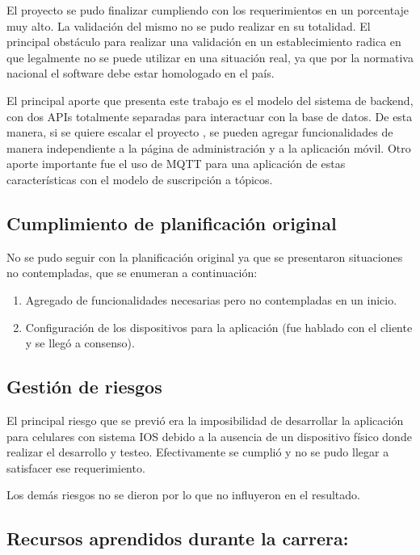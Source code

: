 El proyecto se pudo finalizar cumpliendo con los requerimientos en un porcentaje muy alto. La validación del mismo no se pudo realizar en su totalidad. El principal obstáculo para realizar una validación en un establecimiento radica en que legalmente no se puede utilizar en una situación real, ya que por la normativa nacional el software debe estar homologado en el país.  


El principal aporte que presenta este trabajo es el modelo del sistema de backend, con dos APIs totalmente separadas para interactuar con la base de datos. De esta manera, si se quiere escalar el proyecto , se pueden agregar funcionalidades de manera independiente a la página de administración y a la aplicación móvil. Otro aporte importante fue el uso de MQTT para una aplicación de estas características con el modelo de suscripción a tópicos.




\subsection{Cumplimiento de planificación original}

No se pudo seguir con la planificación original ya que se presentaron situaciones no contempladas, que se enumeran a continuación:
\begin{enumerate}
\item Agregado de funcionalidades necesarias pero no contempladas en un inicio.
\item Configuración de los dispositivos para la aplicación (fue hablado con el cliente y se llegó a consenso).

\end{enumerate}


\subsection{Gestión de riesgos}

El principal riesgo que se previó era la imposibilidad de desarrollar la aplicación para celulares con sistema IOS debido a la ausencia de un dispositivo físico donde realizar el desarrollo y testeo. Efectivamente se cumplió y no se pudo llegar a satisfacer ese requerimiento.

Los demás riesgos no se dieron por lo que no influyeron en el resultado.

\subsection{Recursos aprendidos durante la carrera:}


